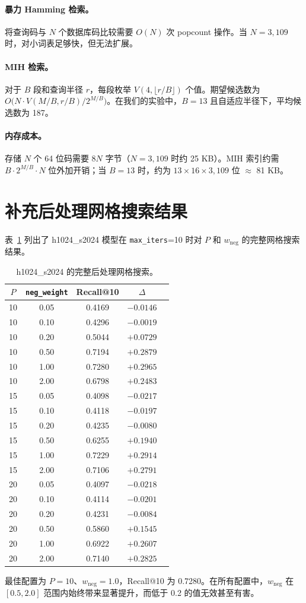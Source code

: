 \documentclass[11pt,a4paper]{article}
\begin{document}
\paragraph{暴力 Hamming 检索。} 将查询码与 $N$ 个数据库码比较需要 $O(N)$ 次 popcount 操作。当 $N=3{,}109$ 时，对小词表足够快，但无法扩展。

\paragraph{MIH 检索。} 对于 $B$ 段和查询半径 $r$，每段枚举 $V(4, \lfloor r/B \rfloor)$ 个值。期望候选数为 $O\bigl(N \cdot V(M/B, r/B) / 2^{M/B}\bigr)$。在我们的实验中，$B=13$ 且自适应半径下，平均候选数为 187。

\paragraph{内存成本。} 存储 $N$ 个 64 位码需要 $8N$ 字节（$N=3{,}109$ 时约 25 KB）。MIH 索引约需 $B \cdot 2^{M/B} \cdot N$ 位外加开销；当 $B=13$ 时，约为 $13 \times 16 \times 3{,}109$ 位 $\approx$ 81 KB。

\section{补充后处理网格搜索结果}

表~\ref{tab:full-grid-cn} 列出了 h1024\_s2024 模型在 \texttt{max\_iters}=10 时对 $P$ 和 $w_{\text{neg}}$ 的完整网格搜索结果。

\begin{table}[htbp]
\centering
\caption{h1024\_s2024 的完整后处理网格搜索。}
\label{tab:full-grid-cn}
\begin{tabular}{ccccc}
\toprule
$P$ & \texttt{neg\_weight} & \textbf{Recall@10} & $\Delta$ \\
\midrule
10 & 0.05 & 0.4169 & $-0.0146$ \\
10 & 0.10 & 0.4296 & $-0.0019$ \\
10 & 0.20 & 0.5044 & $+0.0729$ \\
10 & 0.50 & 0.7194 & $+0.2879$ \\
10 & 1.00 & 0.7280 & $+0.2965$ \\
10 & 2.00 & 0.6798 & $+0.2483$ \\
15 & 0.05 & 0.4098 & $-0.0217$ \\
15 & 0.10 & 0.4118 & $-0.0197$ \\
15 & 0.20 & 0.4235 & $-0.0080$ \\
15 & 0.50 & 0.6255 & $+0.1940$ \\
15 & 1.00 & 0.7229 & $+0.2914$ \\
15 & 2.00 & 0.7106 & $+0.2791$ \\
20 & 0.05 & 0.4097 & $-0.0218$ \\
20 & 0.10 & 0.4114 & $-0.0201$ \\
20 & 0.20 & 0.4231 & $-0.0084$ \\
20 & 0.50 & 0.5860 & $+0.1545$ \\
20 & 1.00 & 0.6922 & $+0.2607$ \\
20 & 2.00 & 0.7140 & $+0.2825$ \\
\bottomrule
\end{tabular}
\end{table}

最佳配置为 $P=10$、$w_{\text{neg}}=1.0$，Recall@10 为 0.7280。在所有配置中，$w_{\text{neg}}$ 在 $[0.5, 2.0]$ 范围内始终带来显著提升，而低于 0.2 的值无效甚至有害。
\end{document}
